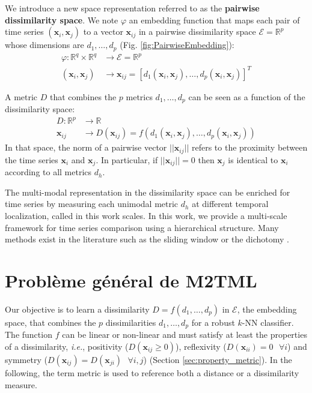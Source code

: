 We introduce a new space representation referred to as the \textbf{pairwise dissimilarity space}. We note $\varphi$ an embedding function that maps each pair of time
series $(\textbf{x}_i, \textbf{x}_j)$ to a vector $\textbf{x}_{ij}$ in a pairwise dissimilarity space $\mathcal{E} = \mathbb{R}^p$ whose dimensions are $d_1, \ldots, d_p$ (Fig. \ref{fig:PairwiseEmbedding}):
\begin{equation}
\begin{aligned}
\varphi : \mathbb{R}^q \times \mathbb{R}^q & \rightarrow \mathcal{E} = \mathbb{R}^p \\
(\textbf{x}_i, \textbf{x}_j) & \rightarrow \textbf{x}_{ij} = [d_1(\textbf{x}_i, \textbf{x}_j), \ldots, d_p(\textbf{x}_i, \textbf{x}_j)]^T
\end{aligned}
\label{eq:projection}
\end{equation}

\noindent A metric $D$ that combines the $p$ metrics $d_1, \ldots, d_p$ can be seen as a function of the dissimilarity space:
\begin{equation}
\begin{aligned}
D : \mathbb{R}^p & \rightarrow \mathbb{R} \\
\textbf{x}_{ij} & \rightarrow D(\textbf{x}_{ij}) = f(d_1(\textbf{x}_i, \textbf{x}_j), \ldots , d_p(\textbf{x}_i, \textbf{x}_j))
\end{aligned}
\label{eq:metric}
\end{equation}
In that space, the norm of a pairwise vector $||\textbf{x}_{ij}||$ refers to the proximity between the time series $\textbf{x}_i$ and $\textbf{x}_j$. In particular, if $||\textbf{x}_{ij}||=0$ then $\textbf{x}_j$ is identical to $\textbf{x}_i$ according to all metrics $d_h$. 

The multi-modal representation in the dissimilarity space can be enriched for time series by measuring each unimodal metric $d_h$ at different temporal localization, called in this work scales. 
In this work, we provide a multi-scale framework for time series comparison using a hierarchical structure. Many methods exist in the literature such as the sliding window \cite{Keogh2003a} or the dichotomy \cite{AhlameDouzal-Chouakria2012}.

\section*{Problème général de M2TML}
Our objective is to learn a dissimilarity $D=f(d_1, \ldots, d_p)$ in $\mathcal{E}$, the embedding space, that combines the $p$ dissimilarities $d_1, \ldots, d_p$ for a robust $k$-NN classifier. The function $f$ can be linear or non-linear and must satisfy at least the properties of a dissimilarity, \textit{i.e.}, positivity ($D(\textbf{x}_{ij} \geq 0)$), reflexivity ($D(\textbf{x}_{ii})=0 \text{ }\forall i$) and symmetry ($D(\textbf{x}_{ij}) = D(\textbf{x}_{ji}) \text{ } \forall i,j$) (Section \ref{sec:property_metric}). In the following, the term metric is used to reference both a distance or a dissimilarity measure.

